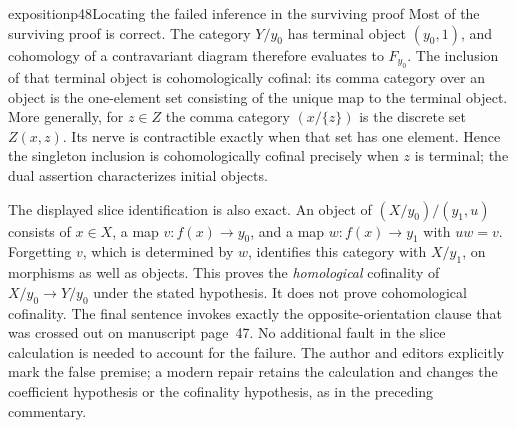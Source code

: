 \begin{dcomment}{exposition}{p48}{Locating the failed inference in the surviving proof}
Most of the surviving proof is correct. The category $Y/y_0$ has
terminal object $(y_0,1)$, and cohomology of a contravariant diagram
therefore evaluates to $F_{y_0}$. The inclusion of that terminal
object is cohomologically cofinal: its comma category over an object
is the one-element set consisting of the unique map to the terminal
object. More generally, for $z\in Z$ the comma category
$(x/\{z\})$ is the discrete set $Z(x,z)$. Its nerve is contractible
exactly when that set has one element. Hence the singleton inclusion
is cohomologically cofinal precisely when $z$ is terminal; the dual
assertion characterizes initial objects.

The displayed slice identification is also exact. An object of
$(X/y_0)/(y_1,u)$ consists of $x\in X$, a map
$v:f(x)\to y_0$, and a map $w:f(x)\to y_1$ with $uw=v$.
Forgetting $v$, which is determined by $w$, identifies this category
with $X/y_1$, on morphisms as well as objects. This proves the
\emph{homological} cofinality of $X/y_0\to Y/y_0$ under the stated
hypothesis. It does not prove cohomological cofinality. The final
sentence invokes exactly the opposite-orientation clause that was
crossed out on manuscript page~47. No additional fault in the slice
calculation is needed to account for the failure. The author and
editors explicitly mark the false premise; a modern repair retains
the calculation and changes the coefficient hypothesis or the
cofinality hypothesis, as in the preceding commentary.
\end{dcomment}


